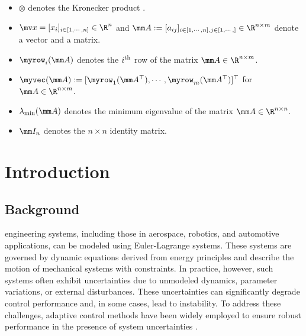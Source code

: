 \documentclass[lettersize,journal]{IEEEtran}
\begin{document}
\begin{itemize}
    \item $\otimes$ denotes the Kronecker product \cite[Definition 7.1.2]{Bernstein:2009aa}.
    \item $\mv x=[x_i]_{i\in[1,\cdots,n]}\in\R^n$ and $
        \mm A
        := 
        [a_{ij}]
        _{
            i\in[1,\cdots,n],j\in[1,\cdots ,]
        }\allowbreak\in\R^{n\times m}
        $ denote a vector and a matrix.
    \item $\myrow_i(\mm A)$ denotes the $i\textsuperscript{th}$ row of the matrix $\mm A\in\R^{n\times m}$. 
    \item $\myvec(\mm A):= [\myrow_1(\mm A^\top)  ,\cdots,\myrow_m(\mm A^\top)  ]^\top   $ for $\mm A\in\R^{n\times m}$.
    \item $\lambda_\text{min}(\mm A)$ denotes the minimum eigenvalue of the matrix $\mm A\in\R^{n\times n}$.
    \item $\mm I_n$ denotes the $n\times n$ identity matrix.
\end{itemize}

\section{Introduction}

\subsection{Background}

 engineering systems, including those in aerospace, robotics, and automotive applications, can be modeled using Euler-Lagrange systems. 
These systems are governed by dynamic equations derived from energy principles and describe the motion of mechanical systems with constraints. 
In practice, however, such systems often exhibit uncertainties due to unmodeled dynamics, parameter variations, or external disturbances. 
These uncertainties can significantly degrade control performance and, in some cases, lead to instability. 
To address these challenges, adaptive control methods have been widely employed to ensure robust performance in the presence of system uncertainties \cite{Ioannou:2006aa, Tao:2003aa}.
\end{document}
